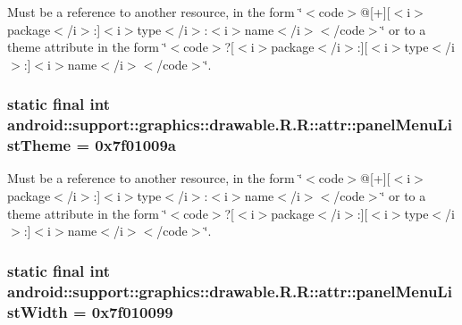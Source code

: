 Must be a reference to another resource, in the form \char`\"{}$<$code$>$@\mbox{[}+\mbox{]}\mbox{[}$<$i$>$package$<$/i$>$:\mbox{]}$<$i$>$type$<$/i$>$:$<$i$>$name$<$/i$>$$<$/code$>$\char`\"{} or to a theme attribute in the form \char`\"{}$<$code$>$?\mbox{[}$<$i$>$package$<$/i$>$:\mbox{]}\mbox{[}$<$i$>$type$<$/i$>$:\mbox{]}$<$i$>$name$<$/i$>$$<$/code$>$\char`\"{}. \hypertarget{classandroid_1_1support_1_1graphics_1_1drawable_1_1_r_1_1attr_af4af198820e7c4415b366d98400c2b9}{
\subsubsection[{panelMenuListTheme}]{\setlength{\rightskip}{0pt plus 5cm}static final int android::support::graphics::drawable.R.R::attr::panelMenuListTheme = 0x7f01009a}}
\label{classandroid_1_1support_1_1graphics_1_1drawable_1_1_r_1_1attr_af4af198820e7c4415b366d98400c2b9}


Must be a reference to another resource, in the form \char`\"{}$<$code$>$@\mbox{[}+\mbox{]}\mbox{[}$<$i$>$package$<$/i$>$:\mbox{]}$<$i$>$type$<$/i$>$:$<$i$>$name$<$/i$>$$<$/code$>$\char`\"{} or to a theme attribute in the form \char`\"{}$<$code$>$?\mbox{[}$<$i$>$package$<$/i$>$:\mbox{]}\mbox{[}$<$i$>$type$<$/i$>$:\mbox{]}$<$i$>$name$<$/i$>$$<$/code$>$\char`\"{}. \hypertarget{classandroid_1_1support_1_1graphics_1_1drawable_1_1_r_1_1attr_e8ad23ea1fba316b03f59513e63ec2f7}{
\subsubsection[{panelMenuListWidth}]{\setlength{\rightskip}{0pt plus 5cm}static final int android::support::graphics::drawable.R.R::attr::panelMenuListWidth = 0x7f010099}}
\label{classandroid_1_1support_1_1graphics_1_1drawable_1_1_r_1_1attr_e8ad23ea1fba316b03f59513e63ec2f7}


